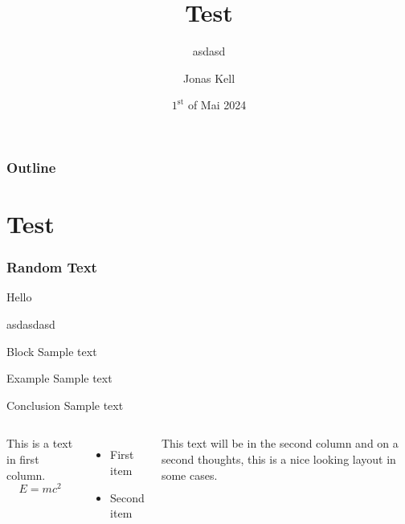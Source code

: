 \documentclass{beamer}
\title[asd]{Test}
\subtitle{asdasd}
\author{Jonas Kell}
\institute[TP III]{Chair for theoretical Physics III}
\date[01.05.2024]{$1^{\text{st}}$ of Mai 2024}
\begin{document}
\maketitle

\begin{frame}
    \frametitle{Outline}

    \tableofcontents

\end{frame}

\section{Test}

\begin{frame}
    \frametitle{Random Text}

    Hello
    
    asdasdasd
\end{frame}

\begin{frame}
    \begin{block}{Block}
        Sample text
    \end{block}

    \begin{exampleblock}{Example}
        Sample text
    \end{exampleblock}

    \begin{alertblock}{Conclusion}
        Sample text
    \end{alertblock}
\end{frame}

\begin{frame}
    \begin{columns}
            This is a text in first column.
            $$E=mc^2$$
            \begin{itemize}
                \item First item
                \item Second item
            \end{itemize}
        
            This text will be in the second column
            and on a second thoughts, this is a nice looking
            layout in some cases.
    \end{columns}
\end{frame}
\end{document}
